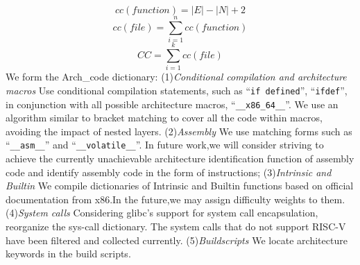 \documentclass[sigconf,screen,review,anonymous]{acmart}
\begin{document}
  \begin{equation}
    {cc}({function}) = \lvert E \rvert - \lvert N \rvert + 2
    \end{equation}
    \begin{equation}
      {cc}({file}) =  \sum_{i=1}^{n} 
      {cc}({function})
      \end{equation}
      \begin{equation}
        {CC} =  \sum_{i=1}^{k} {cc}({file})
        \end{equation}
We form the Arch\_code dictionary:
(1)\textit{Conditional compilation and architecture macros} Use conditional compilation statements, such as ``\texttt{if defined}'', ``\texttt{ifdef}'', in conjunction with all possible architecture macros,
  ``\texttt{\_\_x86\_64\_\_}''.
  We use an algorithm similar to bracket matching to cover all the code within macros, avoiding the impact of nested layers.
  (2)\textit{Assembly} We use matching forms such as ``\texttt{\_\_asm\_\_}'' and ``\texttt{\_\_volatile\_\_}''.
  In future work,we will consider striving to achieve the currently unachievable architecture identification function of assembly code and identify assembly code in the form of instructions;
  (3)\textit{Intrinsic and Builtin} 
  We compile dictionaries of Intrinsic and Builtin functions based on official documentation from x86\cite{x86intrin}.In the future,we may assign difficulty weights to them.
  (4)\textit{System calls} Considering glibc's support for system call encapsulation, reorganize the sys-call dictionary.
  The system calls that do not support RISC-V have been filtered and collected currently.
  (5)\textit{Buildscripts} We locate architecture keywords in the build scripts.
\end{document}
